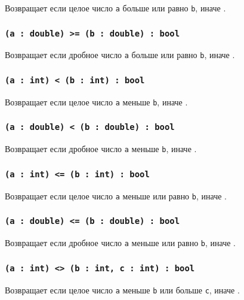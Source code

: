 Возвращает \true{} если целое число \texttt{a} больше или равно \texttt{b}, иначе \false{}.

\subsubsection{\texttt{(a : double) >= (b : double) : bool}}

Возвращает \true{} если дробное число \texttt{a} больше или равно \texttt{b}, иначе \false{}.

\subsubsection{\texttt{(a : int) < (b : int) : bool}}

Возвращает \true{} если целое число \texttt{a} меньше \texttt{b}, иначе \false{}.

\subsubsection{\texttt{(a : double) < (b : double) : bool}}

Возвращает \true{} если дробное число \texttt{a} меньше \texttt{b}, иначе \false{}.

\subsubsection{\texttt{(a : int) <= (b : int) : bool}}

Возвращает \true{} если целое число \texttt{a} меньше или равно \texttt{b}, иначе \false{}.

\subsubsection{\texttt{(a : double) <= (b : double) : bool}}

Возвращает \true{} если дробное число \texttt{a} меньше или равно \texttt{b}, иначе \false{}.

\subsubsection{\texttt{(a : int) <> (b : int, c : int) : bool}}

Возвращает \true{} если целое число \texttt{a} меньше \texttt{b} или больше \texttt{c}, иначе \false{}.

